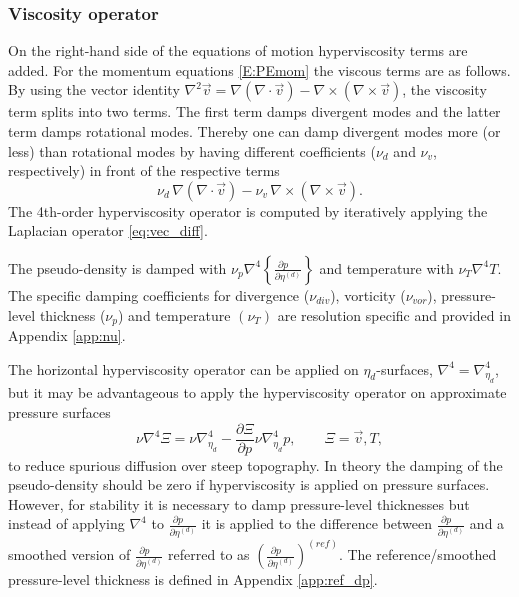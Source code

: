 \documentclass{agujournal}
\begin{document}
{\subsubsection{Viscosity operator}\label{sec:hyper}
On the right-hand side of the equations of motion hyperviscosity terms are added. For the momentum equations \eqref{E:PEmom} the viscous terms are as follows. By using the vector identity  $\nabla^2 \vec{v} = \nabla(\nabla \cdot \vec{v}) - \nabla \times (\nabla \times \vec{v}) $, the viscosity term splits into two terms. The first term damps divergent modes and the latter term damps rotational modes. Thereby one can damp divergent modes more (or less) than rotational modes by having different coefficients ($\nu_d$ and $\nu_v$, respectively) in front of the respective terms
 \begin{equation}
  \nu_d \, \nabla(\nabla \cdot \vec{v}) -
   \nu_v \,  \nabla \times (\nabla \times \vec{v}).\label{eq:vec_diff}
 \end{equation}
The 4th-order hyperviscosity operator is computed by iteratively applying the Laplacian operator \eqref{eq:vec_diff}. 

The pseudo-density is damped with $\nu_p \nabla^4\left\{ \frac{\partial p\quad }{\partial \eta^{(d)}}\right\}$ and temperature with $\nu_T \nabla^4 T$. The specific damping coefficients for divergence ($\nu_{div}$), vorticity ($\nu_{vor}$), pressure-level thickness ($\nu_p$) and temperature $(\nu_T)$ are resolution specific and provided in Appendix \ref{app:nu}.

The horizontal hyperviscosity operator can be applied on $\eta_d$-surfaces, $\nabla^4=\nabla^4_{\eta_d}$, but it may be advantageous to apply the hyperviscosity operator on approximate pressure surfaces
\begin{equation}
\nu \nabla^4 \Xi =\nu \nabla^4_{\eta_d}-\frac{\partial \Xi}{\partial p}\nu \nabla^4_{\eta_d}p,\qquad \Xi=\vec{v}, T,
\end{equation}
\citep[p.58 in ][]{CAM5} to reduce spurious diffusion over steep topography. In theory the damping of the pseudo-density should be zero if hyperviscosity is applied on pressure surfaces. However, for stability it is necessary to damp pressure-level thicknesses but instead of applying $\nabla^4$ to $\frac{\partial p\quad }{\partial \eta^{(d)}}$ it is applied to the difference between $\frac{\partial p\quad }{\partial \eta^{(d)}}$ and a smoothed version of $\frac{\partial p\quad }{\partial \eta^{(d)}}$ referred to as $\left( \frac{\partial p\quad }{\partial \eta^{(d)}}\right)^{(ref)}$. The reference/smoothed pressure-level thickness is defined in Appendix \ref{app:ref_dp}. 

}
\end{document}
